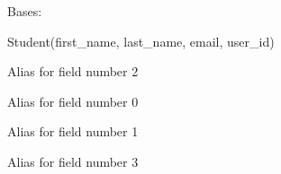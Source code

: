 \documentclass[letterpaper,10pt,english]{sphinxmanual}
\begin{document}
\begin{fulllineitems}
\label{cv_kickstarter:cv_kickstarter.cnapi.Student}
Bases: 

Student(first\_name, last\_name, email, user\_id)

\begin{fulllineitems}
\label{cv_kickstarter:cv_kickstarter.cnapi.Student.email}
Alias for field number 2

\end{fulllineitems}


\begin{fulllineitems}
\label{cv_kickstarter:cv_kickstarter.cnapi.Student.first_name}
Alias for field number 0

\end{fulllineitems}


\begin{fulllineitems}
\label{cv_kickstarter:cv_kickstarter.cnapi.Student.last_name}
Alias for field number 1

\end{fulllineitems}


\begin{fulllineitems}
\label{cv_kickstarter:cv_kickstarter.cnapi.Student.user_id}
Alias for field number 3

\end{fulllineitems}


\end{fulllineitems}

\end{document}

